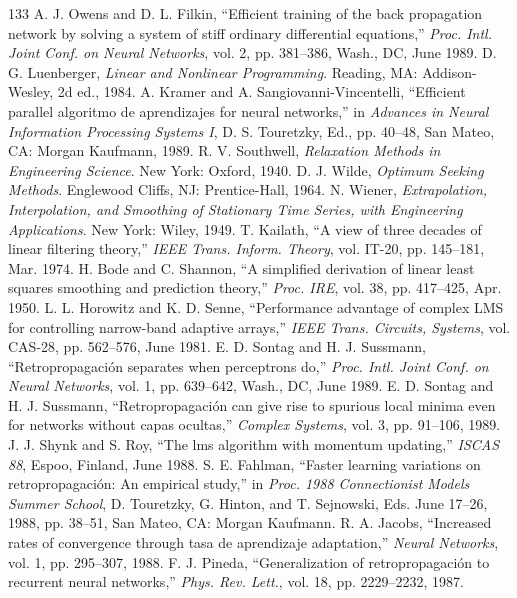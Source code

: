 \documentclass[10pt,twocolumn]{article}
\begin{document}
\begin{thebibliography}{133}
 A. J. Owens and D. L. Filkin, ``Efficient training of the back propagation network by solving a system of stiff ordinary differential equations,'' \textit{Proc. Intl. Joint Conf. on Neural Networks}, vol. 2, pp. 381--386, Wash., DC, June 1989.
 D. G. Luenberger, \textit{Linear and Nonlinear Programming}. Reading, MA: Addison-Wesley, 2d ed., 1984.
 A. Kramer and A. Sangiovanni-Vincentelli, ``Efficient parallel algoritmo de aprendizajes for neural networks,'' in \textit{Advances in Neural Information Processing Systems I}, D. S. Touretzky, Ed., pp. 40--48, San Mateo, CA: Morgan Kaufmann, 1989.
 R. V. Southwell, \textit{Relaxation Methods in Engineering Science}. New York: Oxford, 1940.
 D. J. Wilde, \textit{Optimum Seeking Methods}. Englewood Cliffs, NJ: Prentice-Hall, 1964.
 N. Wiener, \textit{Extrapolation, Interpolation, and Smoothing of Stationary Time Series, with Engineering Applications}. New York: Wiley, 1949.
 T. Kailath, ``A view of three decades of linear filtering theory,'' \textit{IEEE Trans. Inform. Theory}, vol. IT-20, pp. 145--181, Mar. 1974.
 H. Bode and C. Shannon, ``A simplified derivation of linear least squares smoothing and prediction theory,'' \textit{Proc. IRE}, vol. 38, pp. 417--425, Apr. 1950.
 L. L. Horowitz and K. D. Senne, ``Performance advantage of complex LMS for controlling narrow-band adaptive arrays,'' \textit{IEEE Trans. Circuits, Systems}, vol. CAS-28, pp. 562--576, June 1981.
 E. D. Sontag and H. J. Sussmann, ``Retropropagación separates when perceptrons do,'' \textit{Proc. Intl. Joint Conf. on Neural Networks}, vol. 1, pp. 639--642, Wash., DC, June 1989.
 E. D. Sontag and H. J. Sussmann, ``Retropropagación can give rise to spurious local minima even for networks without capas ocultas,'' \textit{Complex Systems}, vol. 3, pp. 91--106, 1989.
 J. J. Shynk and S. Roy, ``The lms algorithm with momentum updating,'' \textit{ISCAS 88}, Espoo, Finland, June 1988.
 S. E. Fahlman, ``Faster learning variations on retropropagación: An empirical study,'' in \textit{Proc. 1988 Connectionist Models Summer School}, D. Touretzky, G. Hinton, and T. Sejnowski, Eds. June 17--26, 1988, pp. 38--51, San Mateo, CA: Morgan Kaufmann.
 R. A. Jacobs, ``Increased rates of convergence through tasa de aprendizaje adaptation,'' \textit{Neural Networks}, vol. 1, pp. 295--307, 1988.
 F. J. Pineda, ``Generalization of retropropagación to recurrent neural networks,'' \textit{Phys. Rev. Lett.}, vol. 18, pp. 2229--2232, 1987.

\end{thebibliography}
\end{document}
